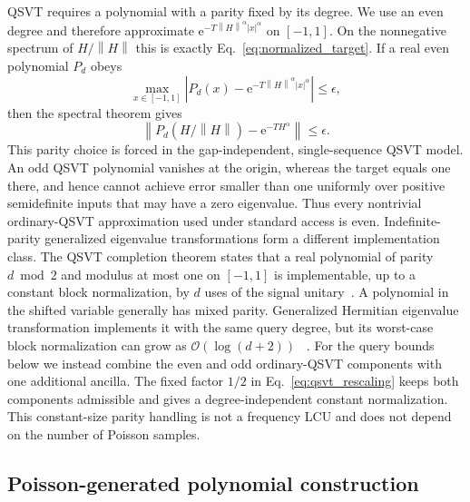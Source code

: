 \documentclass[aps,pra,reprint,floatfix,unsortedaddress,superscriptaddress]{revtex4-2}
\newcommand{\norm}[1]{\left\lVert#1\right\rVert}
\newcommand{\abs}[1]{\left\lvert#1\right\rvert}
\newcommand{\Ocal}{\mathcal{O}}
\begin{document}
QSVT requires a polynomial with a parity fixed by its degree.  We use
an even degree and therefore approximate
$\mathrm e^{-T\norm{H}^{\alpha}\abs{x}^{\alpha}}$ on $[-1,1]$.
On the nonnegative spectrum of $H/\norm{H}$ this is exactly
Eq.~\eqref{eq:normalized_target}.  If a real even polynomial $P_d$
obeys
\begin{equation}
    \max_{x\in[-1,1]}
    \abs{
    P_d(x)-
    \mathrm e^{-T\norm{H}^{\alpha}\abs{x}^{\alpha}}
    }
    \leq\epsilon,
    \label{eq:uniform_scalar_error}
\end{equation}
then the spectral theorem gives
\begin{equation}
    \norm{
    P_d\!\left(H/\norm{H}\right)
    -\mathrm e^{-T H^\alpha}
    }
    \leq\epsilon.
    \label{eq:operator_from_scalar}
\end{equation}
This parity choice is forced in the gap-independent, single-sequence
QSVT model.  An odd QSVT polynomial vanishes at the origin, whereas the
target equals one there, and hence cannot achieve error smaller than
one uniformly over positive semidefinite inputs that may have a zero
eigenvalue.  Thus every nontrivial ordinary-QSVT approximation used
under standard access is even.  Indefinite-parity generalized
eigenvalue transformations form a different implementation class.
The QSVT completion theorem states that a real polynomial of parity
$d\bmod 2$ and modulus at most one on $[-1,1]$ is implementable, up to
a constant block normalization, by $d$ uses of the signal
unitary~\cite{Gilyen2019qsvt}.  A polynomial in the shifted variable
generally has mixed parity.  Generalized Hermitian eigenvalue
transformation implements it with the same query degree, but its
worst-case block normalization can grow as $\Ocal(\log(d+2))$
~\cite{sunderhauf2023generalized}.  For the query bounds below we
instead combine the even and odd ordinary-QSVT components with one
additional ancilla.  The fixed factor $1/2$ in
Eq.~\eqref{eq:qsvt_rescaling} keeps both components admissible and gives
a degree-independent constant normalization.  This constant-size parity
handling is not a frequency LCU and does not depend on the number of
Poisson samples.

\subsection{Poisson-generated polynomial construction}
\label{subsec:poisson_polynomial}
\end{document}

